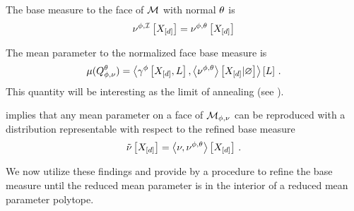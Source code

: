 \begin{definition}
    The base measure to the face of $\mathcal{M}$ with normal $\theta$ is
    \begin{align*}
        \nu^{\phi,\mathcal{I}}\left[X_{[d]}\right]
        =\nu^{\phi,\theta}\left[X_{[d]}\right]
    \end{align*}
\end{definition}

The mean parameter to the normalized face base measure is
\begin{align*}
    \mu(Q^{\theta}_{\phi,\nu}) = \left\langle \gamma^{\phi}\left[X_{[d]},L\right],\left\langle \nu^{\phi,\theta}\right\rangle \left[ X_{[d]} | \varnothing \right]\right\rangle \left[ L \right] \, .
\end{align*}
This quantity will be interesting as the limit of annealing (see ).

 implies that any mean parameter on a face of $\mathcal{M}_{\phi,\nu}$ can be reproduced with a distribution representable with respect to the refined base measure
\begin{align*}
    \tilde{\nu}\left[X_{[d]}\right] = \left\langle \nu,\nu^{\phi,\theta}\right\rangle \left[ X_{[d]} \right] \, .
\end{align*}

We now utilize these findings and provide by  a procedure to refine the base measure until the reduced mean parameter is in the interior of a reduced mean parameter polytope.

